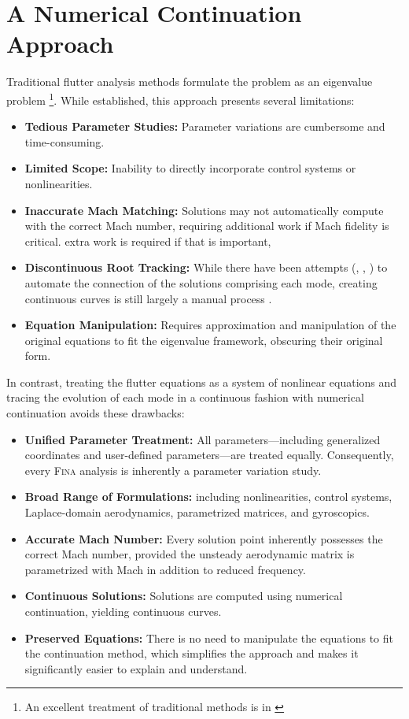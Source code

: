 \documentclass[10pt,openany,twoside]{book}
\numberwithin{equation}{section}   %
\newcommand{\Fina}{{\normalfont\scshape Fina\:}}
\begin{document}
\section{A Numerical Continuation Approach}
Traditional flutter analysis methods formulate the problem as an eigenvalue
problem
\footnote{An excellent treatment of traditional methods is in \cite{demasi2024introduction}}.
While established, this approach presents several limitations:
\begin{itemize}
	\item {\bf Tedious Parameter Studies:} Parameter variations are cumbersome
		and time-consuming.
	\item {\bf Limited Scope:} Inability to directly incorporate control systems or
		nonlinearities.
	\item {\bf Inaccurate Mach Matching:} Solutions may not automatically compute with the
	    correct Mach number, requiring additional work if Mach fidelity is critical.
		extra work is required if that is important,
	\item {\bf Discontinuous Root Tracking:} While there have been attempts
		(\cite{desmarais1974automated}, \cite{eldred1995new}, \cite{chen2000damping})
		to automate the connection of the solutions comprising each mode,
		creating continuous curves is still largely a manual process
		\cite{demasi2024introduction}.
	\item {\bf Equation Manipulation:} Requires approximation and manipulation of the original
	   equations to fit the eigenvalue framework, obscuring their original form.
\end{itemize}
In contrast, treating the flutter equations as a system of nonlinear equations and
tracing the evolution of each mode in a continuous fashion with numerical
continuation avoids these drawbacks:
\begin{itemize}
	\item {\bf Unified Parameter Treatment:} All parameters---including
		generalized coordinates
	    and user-defined parameters---are treated equally. Consequently, every \Fina
		 analysis is inherently a parameter variation study.
	\item {\bf Broad Range of Formulations:} including nonlinearities,
		control systems, Laplace-domain aerodynamics, parametrized matrices,
		and gyroscopics.
	\item {\bf Accurate Mach Number:} Every solution point inherently possesses the
	     correct Mach number, provided the unsteady aerodynamic matrix is parametrized
		  with Mach in addition to reduced frequency.
	\item {\bf Continuous Solutions:} Solutions are computed using
	    numerical continuation, yielding continuous curves.
	\item {\bf Preserved Equations:} There is no need to manipulate the equations to
	     fit the continuation method, which simplifies the approach and makes it
		  significantly easier to explain and understand.
\end{itemize}
\end{document}
